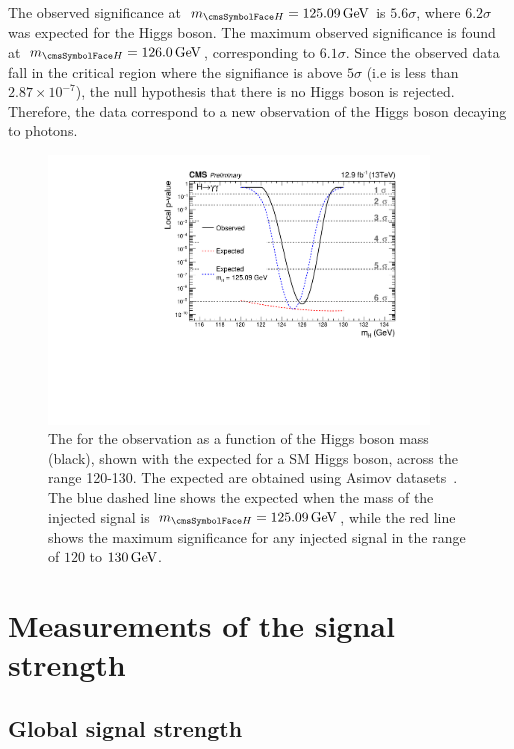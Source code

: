 The observed significance at $\mH=125.09\GeV$ is $5.6\sigma$, where $6.2\sigma$ was expected for the \SM Higgs boson. The maximum observed significance is found at $\mH=126.0\GeV$, corresponding to $6.1\sigma$.
Since the observed data fall in the critical region where the signifiance is above $5\sigma$ (i.e \pvalue is less than $2.87 \times 10^{-7}$), the null hypothesis that there is no Higgs boson is rejected. Therefore, the data correspond to a new observation of the Higgs boson decaying to photons.

\begin{figure}[ht!]
\centering
\includegraphics[width=0.9\textwidth]{statandresultsFigures/pval13TeV-observed.pdf} 
\caption{The \pvalue for the observation as a function of the Higgs boson mass (black), shown with the expected \pvalue\s for a SM Higgs boson, across the range 120-130\GeV. The expected \pvalue\s are obtained using Asimov datasets~\cite{Cowan:2010js}. The blue dashed line shows the expected \pvalue when the mass of the injected signal is $\mH=125.09\GeV$, while the red line shows the maximum significance for any injected signal in the range of $120$ to $130\,\text{Ge\hspace{-.08em}V}$.}

\label{fig:statandresults:pval}
\end{figure}

\section{Measurements of the signal strength}
\label{sec:statandresults:sigstrength}
\subsection{Global signal strength}
\label{sec:statandresults:sigstrength_global}

